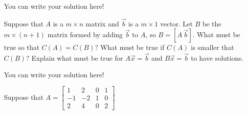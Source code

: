 \documentclass[]{exam}
\begin{document}
\begin{questions}
\begin{solution}
	You can write your solution here!
\end{solution}

\question Suppose that $A$ is a $m \times n$ matrix and $\vec{b}$ is a $m \times 1$ vector. Let $B$ be the $m \times (n+1)$ matrix formed by adding $\vec{b}$ to $A$, so $B = [A \, \vec{b}]$. What must be true so that $C(A)=C(B)$? What must be true if $C(A)$ is smaller that $C(B)$? Explain what must be true for $A \vec{x} = \vec{b}$ and $B \vec{x} = \vec{b}$ to have solutions. 


\begin{solution}
	You can write your solution here!
\end{solution}


\question Suppose that $A = 
\begin{bmatrix}
	1 & 2 & 0 & 1\\
	-1 & -2 & 1 & 0\\
	2 & 4 & 0 & 2
\end{bmatrix}$


\end{questions}
\end{document}

